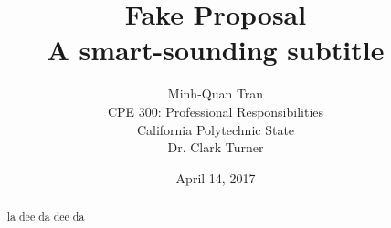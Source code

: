 


\title{\vfill Fake Proposal\\
\vspace{8pt}
\normalsize{A smart-sounding subtitle}
}

\author{Minh-Quan Tran\\
\normalsize{CPE 300: Professional Responsibilities}\\
\normalsize{California Polytechnic State}\\
\normalsize{Dr. Clark Turner}
}

\date{April 14, 2017}

\maketitle


\vfill

\begin{abstract}

la dee da dee da
\end{abstract}

\pagebreak
\tableofcontents
\pagebreak
